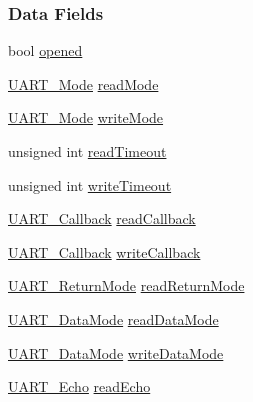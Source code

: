 \subsubsection*{Data Fields}
\begin{DoxyCompactItemize}
\item 
bool \hyperlink{struct_u_a_r_t_c_c3200_d_m_a___object_ab51f5ef49aa00ef889bb8961e8eab614}{opened}
\item 
\hyperlink{_u_a_r_t_8h_a2507a620dba95cd20885c52494d19e90}{U\-A\-R\-T\-\_\-\-Mode} \hyperlink{struct_u_a_r_t_c_c3200_d_m_a___object_a8b8e37ff4d420c61417ef46e2852a0ab}{read\-Mode}
\item 
\hyperlink{_u_a_r_t_8h_a2507a620dba95cd20885c52494d19e90}{U\-A\-R\-T\-\_\-\-Mode} \hyperlink{struct_u_a_r_t_c_c3200_d_m_a___object_ae7622be45e956ec3e16e3fe767a706cf}{write\-Mode}
\item 
unsigned int \hyperlink{struct_u_a_r_t_c_c3200_d_m_a___object_a5943ba05eec872a17d7f19304f685fce}{read\-Timeout}
\item 
unsigned int \hyperlink{struct_u_a_r_t_c_c3200_d_m_a___object_a0be45cf7138ccd950c2354b4858db7f4}{write\-Timeout}
\item 
\hyperlink{_u_a_r_t_8h_a74c489f070c575fb11654fe74302b5b8}{U\-A\-R\-T\-\_\-\-Callback} \hyperlink{struct_u_a_r_t_c_c3200_d_m_a___object_adfd2097d9ec818ba037d96239e4ab85b}{read\-Callback}
\item 
\hyperlink{_u_a_r_t_8h_a74c489f070c575fb11654fe74302b5b8}{U\-A\-R\-T\-\_\-\-Callback} \hyperlink{struct_u_a_r_t_c_c3200_d_m_a___object_a3d0cea18d5a6b812e0614028ccc95fb9}{write\-Callback}
\item 
\hyperlink{_u_a_r_t_8h_acb5a82843435a1b5d51b6c27028d914f}{U\-A\-R\-T\-\_\-\-Return\-Mode} \hyperlink{struct_u_a_r_t_c_c3200_d_m_a___object_abd54b67eb5998f62f7e50c46df2714c7}{read\-Return\-Mode}
\item 
\hyperlink{_u_a_r_t_8h_a694090fdb166f94ac30b809f9cba87b8}{U\-A\-R\-T\-\_\-\-Data\-Mode} \hyperlink{struct_u_a_r_t_c_c3200_d_m_a___object_a9eb3a73262e66a98a094286ae405be6c}{read\-Data\-Mode}
\item 
\hyperlink{_u_a_r_t_8h_a694090fdb166f94ac30b809f9cba87b8}{U\-A\-R\-T\-\_\-\-Data\-Mode} \hyperlink{struct_u_a_r_t_c_c3200_d_m_a___object_a0e7fb686f70a774538bec4bacbab9a0c}{write\-Data\-Mode}
\item 
\hyperlink{_u_a_r_t_8h_aac6a03c2e1d76f53e1d9d923dcdc24f2}{U\-A\-R\-T\-\_\-\-Echo} \hyperlink{struct_u_a_r_t_c_c3200_d_m_a___object_ac8892b135c42d86085b1c86f40e2aa43}{read\-Echo}
\item 

\end{DoxyCompactItemize}
